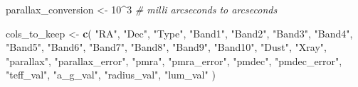 \documentclass[]{article}
\newenvironment{Shaded}{\begin{snugshade}}{\end{snugshade}}
\newcommand{\CommentTok}[1]{\textcolor[rgb]{0.56,0.35,0.01}{\textit{#1}}}
\newcommand{\DecValTok}[1]{\textcolor[rgb]{0.00,0.00,0.81}{#1}}
\newcommand{\KeywordTok}[1]{\textcolor[rgb]{0.13,0.29,0.53}{\textbf{#1}}}
\newcommand{\NormalTok}[1]{#1}
\newcommand{\OperatorTok}[1]{\textcolor[rgb]{0.81,0.36,0.00}{\textbf{#1}}}
\newcommand{\StringTok}[1]{\textcolor[rgb]{0.31,0.60,0.02}{#1}}
\begin{document}
\begin{Shaded}
\begin{Highlighting}[]
\NormalTok{parallax_conversion <-}\StringTok{ }\DecValTok{10}\OperatorTok{^}\DecValTok{3} \CommentTok{# milli arcseconds to arcseconds}

\NormalTok{cols_to_keep <-}\StringTok{ }\KeywordTok{c}\NormalTok{(}
                  \StringTok{"RA"}\NormalTok{,}
                  \StringTok{"Dec"}\NormalTok{,}
                  \StringTok{"Type"}\NormalTok{,}
                  \StringTok{"Band1"}\NormalTok{,}
                  \StringTok{"Band2"}\NormalTok{,}
                  \StringTok{"Band3"}\NormalTok{,}
                  \StringTok{"Band4"}\NormalTok{,}
                  \StringTok{"Band5"}\NormalTok{,}
                  \StringTok{"Band6"}\NormalTok{,}
                  \StringTok{"Band7"}\NormalTok{,}
                  \StringTok{"Band8"}\NormalTok{,}
                  \StringTok{"Band9"}\NormalTok{,}
                  \StringTok{"Band10"}\NormalTok{,}
                  \StringTok{"Dust"}\NormalTok{,}
                  \StringTok{"Xray"}\NormalTok{,}
                  \StringTok{"parallax"}\NormalTok{,}
                  \StringTok{"parallax_error"}\NormalTok{,}
                  \StringTok{"pmra"}\NormalTok{,}
                  \StringTok{"pmra_error"}\NormalTok{,}
                  \StringTok{"pmdec"}\NormalTok{,}
                  \StringTok{"pmdec_error"}\NormalTok{,}
                  \StringTok{"teff_val"}\NormalTok{,}
                  \StringTok{"a_g_val"}\NormalTok{,}
                  \StringTok{"radius_val"}\NormalTok{,}
                  \StringTok{"lum_val"}
\NormalTok{                  )}



\end{Highlighting}
\end{Shaded}
\end{document}
